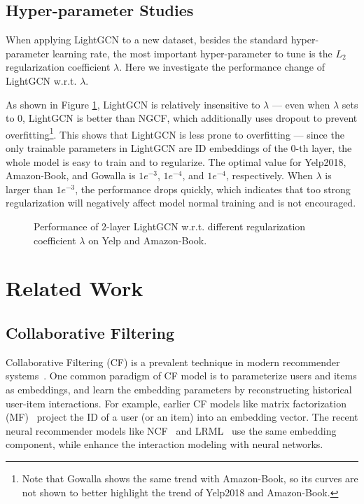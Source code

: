\documentclass[sigconf]{acmart}
\theoremstyle{definition}
\begin{document}
\subsection{Hyper-parameter Studies}\label{ss:exp-hyper}
When applying LightGCN to a new dataset, besides the standard hyper-parameter learning rate, the most important hyper-parameter to tune is the $L_2$ regularization coefficient $\lambda$. 
Here we investigate the performance change of LightGCN w.r.t. $\lambda$. 

As shown in Figure \ref{fig:reg},
LightGCN is relatively insensitive to $\lambda$ --- even when $\lambda$ sets to 0, LightGCN is better than NGCF, which additionally uses dropout to prevent overfitting\footnote{Note that Gowalla shows the same trend with Amazon-Book, so its curves are not shown to better highlight the trend of Yelp2018 and Amazon-Book.}. 
This shows that LightGCN is less prone to overfitting --- since the only trainable parameters in LightGCN are ID embeddings of the 0-th layer, the whole model is easy to train and to regularize. The optimal value for Yelp2018, Amazon-Book, and Gowalla is $1e^{-3}$, $1e^{-4}$, and  $1e^{-4}$, respectively. When $\lambda$ is larger than $1e^{-3}$, the performance drops quickly, which indicates that too strong regularization will negatively affect model normal training and is not encouraged. 

\begin{figure}[t]
	\centering
	\vspace{-15pt}
	\caption{Performance of 2-layer LightGCN w.r.t. different regularization coefficient $\lambda$ on Yelp and Amazon-Book.} \vspace{-10pt}
	\label{fig:reg}
\end{figure}

%
 \section{Related Work}\label{sec:related}


\subsection{Collaborative Filtering}
Collaborative Filtering (CF) is a prevalent technique in modern recommender systems~\cite{YoutubeRS,PinSage}.
One common paradigm of CF model is to parameterize users and items as embeddings, and learn the embedding parameters by reconstructing historical user-item interactions.
For example, earlier CF models like matrix factorization (MF)~\cite{MF,BPRMF} project the ID of a user (or an item) into an embedding vector. The recent neural recommender models like NCF~\cite{NCF} and LRML~\cite{tay2018latent} use the same embedding component, while enhance the interaction modeling with neural networks. 
\end{document}
